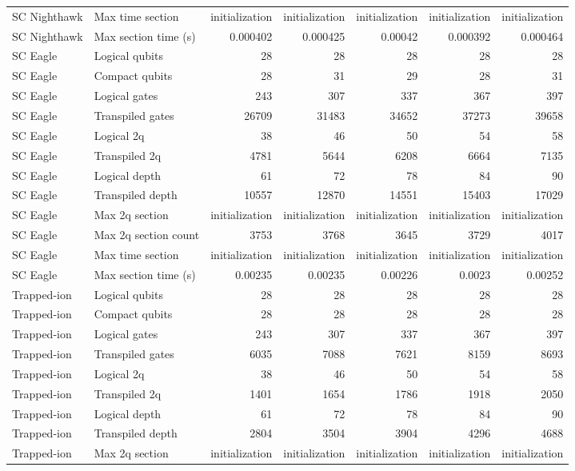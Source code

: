 \begin{table}
\begin{tabular}{llrrrrr}
SC Nighthawk & Max time section & initialization & initialization & initialization & initialization & initialization \\
SC Nighthawk & Max section time (s) & 0.000402 & 0.000425 & 0.00042 & 0.000392 & 0.000464 \\
\hline
SC Eagle & Logical qubits & 28 & 28 & 28 & 28 & 28 \\
SC Eagle & Compact qubits & 28 & 31 & 29 & 28 & 31 \\
SC Eagle & Logical gates & 243 & 307 & 337 & 367 & 397 \\
SC Eagle & Transpiled gates & 26709 & 31483 & 34652 & 37273 & 39658 \\
SC Eagle & Logical 2q & 38 & 46 & 50 & 54 & 58 \\
SC Eagle & Transpiled 2q & 4781 & 5644 & 6208 & 6664 & 7135 \\
SC Eagle & Logical depth & 61 & 72 & 78 & 84 & 90 \\
SC Eagle & Transpiled depth & 10557 & 12870 & 14551 & 15403 & 17029 \\
SC Eagle & Max 2q section & initialization & initialization & initialization & initialization & initialization \\
SC Eagle & Max 2q section count & 3753 & 3768 & 3645 & 3729 & 4017 \\
SC Eagle & Max time section & initialization & initialization & initialization & initialization & initialization \\
SC Eagle & Max section time (s) & 0.00235 & 0.00235 & 0.00226 & 0.0023 & 0.00252 \\
\hline
Trapped-ion & Logical qubits & 28 & 28 & 28 & 28 & 28 \\
Trapped-ion & Compact qubits & 28 & 28 & 28 & 28 & 28 \\
Trapped-ion & Logical gates & 243 & 307 & 337 & 367 & 397 \\
Trapped-ion & Transpiled gates & 6035 & 7088 & 7621 & 8159 & 8693 \\
Trapped-ion & Logical 2q & 38 & 46 & 50 & 54 & 58 \\
Trapped-ion & Transpiled 2q & 1401 & 1654 & 1786 & 1918 & 2050 \\
Trapped-ion & Logical depth & 61 & 72 & 78 & 84 & 90 \\
Trapped-ion & Transpiled depth & 2804 & 3504 & 3904 & 4296 & 4688 \\
Trapped-ion & Max 2q section & initialization & initialization & initialization & initialization & initialization \\

\end{tabular}
\end{table}
